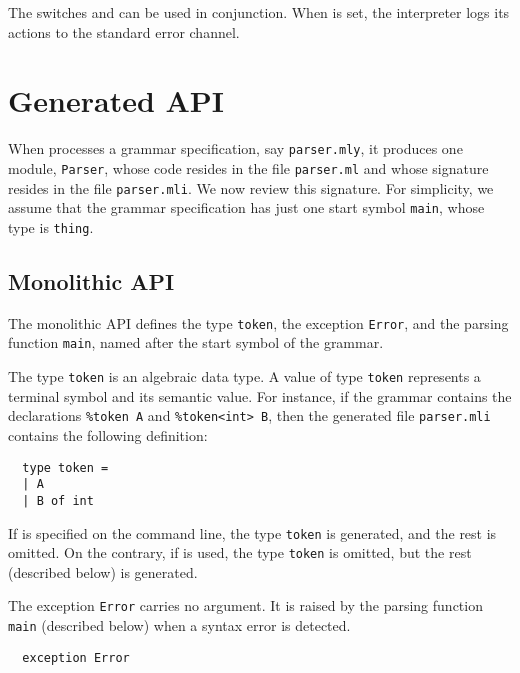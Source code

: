 \documentclass[onecolumn,11pt,nocopyrightspace,preprint]{sigplanconf}
\begin{document}
The switches \ointerpret and \otrace can be used in conjunction. When
\otrace is set, the interpreter logs its actions to the standard error
channel.


\section{Generated API}

When \menhir processes a grammar specification, say \texttt{parser.mly}, it
produces one \ocaml module, \texttt{Parser}, whose code resides in the file
\texttt{parser.ml} and whose signature resides in the file
\texttt{parser.mli}. We now review this signature. For simplicity,
we assume that the grammar specification has just one start symbol
\verb+main+, whose \ocaml type is \verb+thing+.


\subsection{Monolithic API}
\label{sec:monolithic}

The monolithic API defines the type \verb+token+, the exception \verb+Error+,
and the parsing function \verb+main+, named after the start symbol of the
grammar.


The type \verb+token+ is an algebraic data type. A value of type \verb+token+
represents a terminal symbol and its semantic value. For instance, if the
grammar contains the declarations \verb+%token A+ and \verb+%token<int> B+,
then the generated file \texttt{parser.mli} contains the following definition:
\begin{verbatim}
  type token =
  | A
  | B of int
\end{verbatim}
%
If \oonlytokens is specified on the command line, the type \verb+token+ is
generated, and the rest is omitted. On the contrary, if \oexternaltokens is
used, the type \verb+token+ is omitted, but the rest (described below) is
generated.


The exception \verb+Error+ carries no argument. It is raised by the parsing
function \verb+main+ (described below) when a syntax error is detected.
%
\begin{verbatim}
  exception Error
\end{verbatim}
\end{document}

